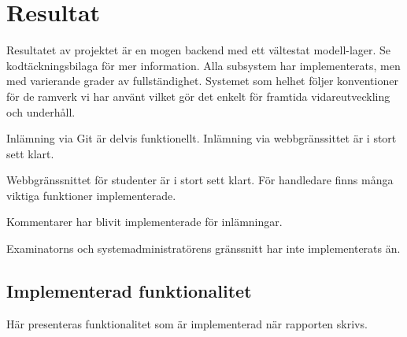 \section{Resultat}
Resultatet av projektet är en mogen backend med ett vältestat modell-lager. Se kodtäckningsbilaga för mer information. Alla subsystem har implementerats, men med varierande grader av fullständighet. Systemet som helhet följer konventioner för de ramverk vi har använt vilket gör det enkelt för framtida vidareutveckling och underhåll.

Inlämning via Git är delvis funktionellt. Inlämning via webbgränssittet är i stort sett klart.

Webbgränssnittet för studenter är i stort sett klart. För handledare finns många viktiga funktioner implementerade.

Kommentarer har blivit implementerade för inlämningar.

Examinatorns och systemadministratörens gränssnitt har inte implementerats än.

\subsection{Implementerad funktionalitet}
Här presenteras funktionalitet som är implementerad när rapporten skrivs.
